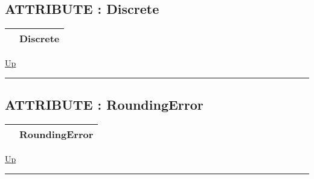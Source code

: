 \subsection*{ATTRIBUTE : Discrete}
\hypertarget{ecldoc:ml_core.config.discrete}{}

{\renewcommand{\arraystretch}{1.5}
\begin{tabularx}{\textwidth}{|>{\raggedright\arraybackslash}l|X|}
\hline
\hspace{0pt} & Discrete \\
\hline
\end{tabularx}
}

\hyperlink{ecldoc:ML_Core.Config}{Up}

\par


\rule{\textwidth}{0.4pt}
\subsection*{ATTRIBUTE : RoundingError}
\hypertarget{ecldoc:ml_core.config.roundingerror}{}

{\renewcommand{\arraystretch}{1.5}
\begin{tabularx}{\textwidth}{|>{\raggedright\arraybackslash}l|X|}
\hline
\hspace{0pt} & RoundingError \\
\hline
\end{tabularx}
}

\hyperlink{ecldoc:ML_Core.Config}{Up}

\par


\rule{\textwidth}{0.4pt}


